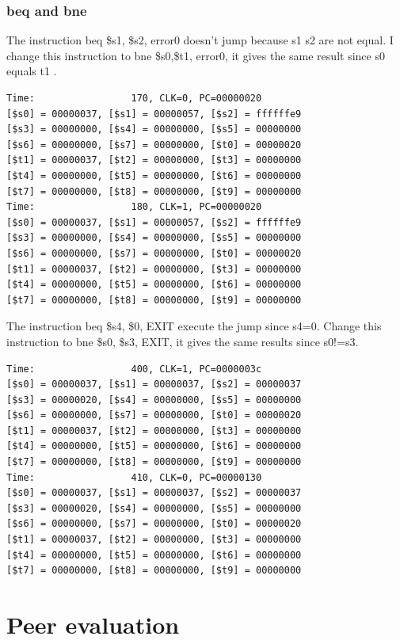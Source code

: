 \documentclass[a4paper,12pt]{article}
\begin{document}
\subsubsection{beq and bne}
\par The instruction beq \$s1, \$s2, error0 doesn't jump because s1 s2 are not equal. I change this instruction to bne \$s0,\$t1, error0, it gives the same result since s0 equals t1 .
\begin{lstlisting}
Time:                 170, CLK=0, PC=00000020
[$s0] = 00000037, [$s1] = 00000057, [$s2] = ffffffe9
[$s3] = 00000000, [$s4] = 00000000, [$s5] = 00000000
[$s6] = 00000000, [$s7] = 00000000, [$t0] = 00000020
[$t1] = 00000037, [$t2] = 00000000, [$t3] = 00000000
[$t4] = 00000000, [$t5] = 00000000, [$t6] = 00000000
[$t7] = 00000000, [$t8] = 00000000, [$t9] = 00000000
Time:                 180, CLK=1, PC=00000020
[$s0] = 00000037, [$s1] = 00000057, [$s2] = ffffffe9
[$s3] = 00000000, [$s4] = 00000000, [$s5] = 00000000
[$s6] = 00000000, [$s7] = 00000000, [$t0] = 00000020
[$t1] = 00000037, [$t2] = 00000000, [$t3] = 00000000
[$t4] = 00000000, [$t5] = 00000000, [$t6] = 00000000
[$t7] = 00000000, [$t8] = 00000000, [$t9] = 00000000
\end{lstlisting}

\par The instruction beq \$s4, \$0, EXIT execute the jump since s4=0. Change this instruction to bne \$s0, \$s3, EXIT, it gives the same results since s0!=s3.

\begin{lstlisting}
Time:                 400, CLK=1, PC=0000003c
[$s0] = 00000037, [$s1] = 00000037, [$s2] = 00000037
[$s3] = 00000020, [$s4] = 00000000, [$s5] = 00000000
[$s6] = 00000000, [$s7] = 00000000, [$t0] = 00000020
[$t1] = 00000037, [$t2] = 00000000, [$t3] = 00000000
[$t4] = 00000000, [$t5] = 00000000, [$t6] = 00000000
[$t7] = 00000000, [$t8] = 00000000, [$t9] = 00000000
Time:                 410, CLK=0, PC=00000130
[$s0] = 00000037, [$s1] = 00000037, [$s2] = 00000037
[$s3] = 00000020, [$s4] = 00000000, [$s5] = 00000000
[$s6] = 00000000, [$s7] = 00000000, [$t0] = 00000020
[$t1] = 00000037, [$t2] = 00000000, [$t3] = 00000000
[$t4] = 00000000, [$t5] = 00000000, [$t6] = 00000000
[$t7] = 00000000, [$t8] = 00000000, [$t9] = 00000000
\end{lstlisting}

\section{Peer evaluation}
\end{document}
